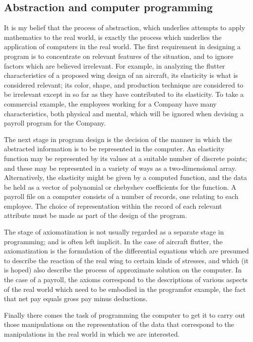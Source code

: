\subsection{Abstraction and computer programming}

It is my belief that the process of abstraction, which underlies attempts to apply mathematics to the real world, is exactly the process which underlies the application of computers in the real world. The first requirement in designing a program is to concentrate on relevant features of the situation, and to ignore factors which are believed irrelevant. For example, in analyzing the flutter characteristics of a proposed wing design of an aircraft, its elasticity is what is considered relevant; its color, shape, and production technique are considered to be irrelevant except in so far as they have contributed to its elasticity. To take a commercial example, the employees working for a Company have many characteristics, both physical and mental, which will be ignored when devising a payroll program for the Company.

The next stage in program design is the decision of the manner in which the abstracted information is to be represented in the computer. An elasticity function may be represented by its values at a suitable number of discrete points; and these may be represented in a variety of ways as a two-dimensional array. Alternatively, the elasticity might be given by a computed function, and the data be held as a vector of polynomial or chebyshev coefficients for the function. A payroll file on a computer consists of a number of records, one relating to each employee. The choice of representation within the record of each relevant attribute must be made as part of the design of the program.

The stage of axiomatization is not usually regarded as a separate stage in programming; and is often left implicit. In the case of aircraft flutter, the axiomatization is the formulation of the differential equations which are presumed to describe the reaction of the real wing to certain kinds of stresses, and which (it is hoped) also describe the process of approximate solution on the computer. In the case of a payroll, the axioms correspond to the descriptions of various aspects of the real world which need to be embodied in the program\textemdash{}for example, the fact that net pay equals gross pay minus deductions.

Finally there comes the task of programming the computer to get it to carry out those manipulations on the representation of the data that correspond to the manipulations in the real world in which we are interested. 


